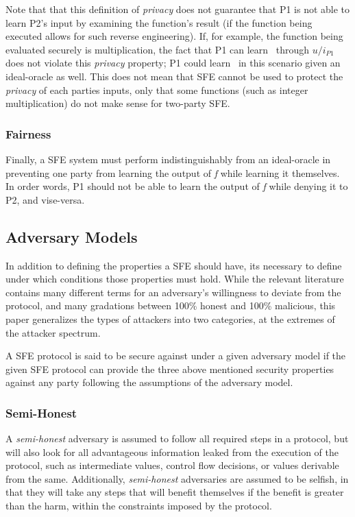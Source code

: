 Note that that this definition of \emph{privacy} does not guarantee that \ac{P1} is not able to learn \ac{P2}'s input by examining the function's result (if the function being executed allows for such reverse engineering).  If, for example, the function being evaluated securely is multiplication, the fact that \ac{P1} can learn \ptwoin\ through $u/i_{P1}$ does not violate this \emph{privacy} property; \ac{P1} could learn \ptwoin\ in this scenario given an ideal-oracle as well.  This does not mean that \ac{SFE} cannot be used to protect the \emph{privacy} of each parties inputs, only that some functions (such as integer multiplication) do not make sense for two-party \ac{SFE}.

\subsubsection{Fairness}

Finally, a \ac{SFE} system must perform indistinguishably from an ideal-oracle in preventing one party from learning the output of \emph{f} while learning it themselves.  In order words, \ac{P1} should not be able to learn the output of \emph{f} while denying it to \ac{P2}, and vise-versa.

\subsection{Adversary Models}

In addition to defining the properties a \ac{SFE} should have, its necessary to define under which conditions those properties must hold.  While the relevant literature contains many different terms for an adversary's willingness to deviate from the protocol, and many gradations between 100\% honest and 100\% malicious, this paper generalizes the types of attackers into two categories, at the extremes of the attacker spectrum.

A \ac{SFE} protocol is said to be secure against under a given adversary model if the given \ac{SFE} protocol can provide the three above mentioned security properties against any party following the assumptions of the adversary model.

\subsubsection{Semi-Honest}

A \emph{semi-honest} adversary is assumed to follow all required steps in a protocol, but will also look for all advantageous information leaked from the execution of the protocol, such as intermediate values, control flow decisions, or values derivable from the same\cite{goldreich1998secure}.  Additionally, \emph{semi-honest} adversaries are assumed to be selfish, in that they will take any steps that will benefit themselves if the benefit is greater than the harm, within the constraints imposed by the protocol.



